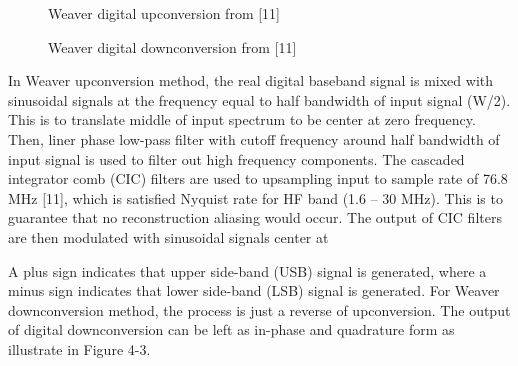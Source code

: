 \documentclass[conference]{IEEEtran}
\begin{document}
\begin{figure}[h!]
	\centering
	\caption{Weaver digital upconversion from [11]}
\end{figure}

\begin{figure}[h!]
	\centering
	\caption{Weaver digital downconversion from [11]}
\end{figure}

In Weaver upconversion method, the real digital baseband signal is mixed with sinusoidal signals at the frequency equal to half bandwidth of input signal (W/2). This is to translate middle of input spectrum to be center at zero frequency. Then, liner phase low-pass filter with cutoff frequency around half bandwidth of input signal is used to filter out high frequency components. The cascaded integrator comb (CIC) filters are used to upsampling input to sample rate of 76.8 MHz [11], which is satisfied Nyquist rate for HF band (1.6 – 30 MHz). This is to guarantee that no reconstruction aliasing would occur. The output of CIC filters are then modulated with sinusoidal signals center at
\begin{figure}[h!]
	\centering
\end{figure}
A plus sign indicates that upper side-band (USB) signal is generated, where a minus sign indicates that lower side-band (LSB) signal is generated. For Weaver downconversion method, the process is just a reverse of upconversion. The output of digital downconversion can be left as in-phase and quadrature form as illustrate in Figure 4-3. 
\end{document}
